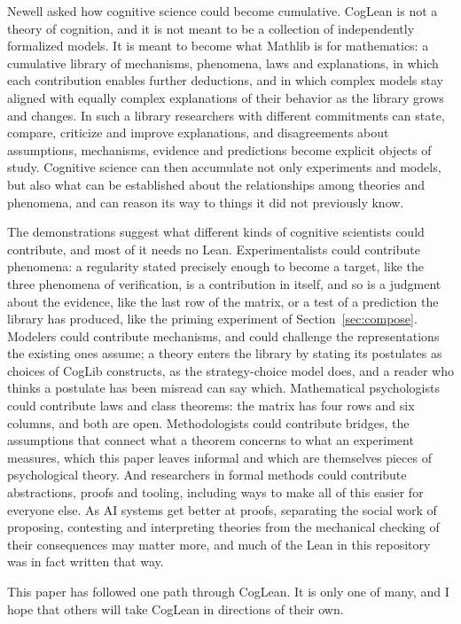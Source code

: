\documentclass[11pt]{article}
\begin{document}
Newell asked how cognitive science could become cumulative. CogLean is
not a theory of cognition, and it is not meant to be a collection of
independently formalized models. It is meant to become what Mathlib is
for mathematics: a cumulative library of mechanisms, phenomena, laws
and explanations, in which each contribution enables further
deductions, and in which complex models stay aligned with equally
complex explanations of their behavior as the library grows and
changes. In such a library researchers with different commitments can
state, compare, criticize and improve explanations, and disagreements
about assumptions, mechanisms, evidence and predictions become
explicit objects of study. Cognitive science can then accumulate not
only experiments and models, but also what can be established about
the relationships among theories and phenomena, and can reason its way
to things it did not previously know.

The demonstrations suggest what different kinds of cognitive
scientists could contribute, and most of it needs no Lean.
Experimentalists could contribute phenomena: a regularity stated
precisely enough to become a target, like the three phenomena of
verification, is a contribution in itself, and so is a judgment about
the evidence, like the last row of the matrix, or a test of a
prediction the library has produced, like the priming experiment of
Section~\ref{sec:compose}. Modelers could contribute mechanisms, and
could challenge the representations the existing ones assume; a
theory enters the library by stating its postulates as choices of
CogLib constructs, as the strategy-choice model does, and a reader who
thinks a postulate has been misread can say which. Mathematical
psychologists could contribute laws and class theorems: the matrix has
four rows and six columns, and both are open. Methodologists could
contribute bridges, the assumptions that connect what a theorem
concerns to what an experiment measures, which this paper leaves
informal and which are themselves pieces of psychological theory.
And researchers in formal methods could contribute abstractions,
proofs and tooling, including ways to make all of this easier for
everyone else. As AI systems get better at proofs, separating the
social work of proposing, contesting and interpreting theories from
the mechanical checking of their consequences may matter more, and
much of the Lean in this repository was in fact written that way.

This paper has followed one path through CogLean. It is only one of
many, and I hope that others will take CogLean in directions of their
own.
\end{document}
